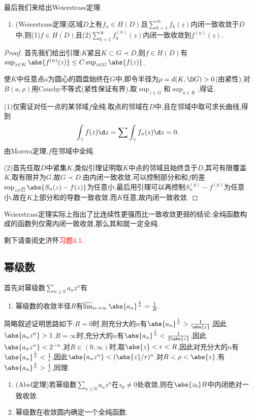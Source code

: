 \documentclass{article}
\newcommand{\exerfunc}[1]{剩下请查阅史济怀\textcolor{red}{习题#1}.}
\begin{document}
最后我们来给出Weierstrass定理.\begin{enumerate}[resume]
    \item (Weierstrass定理)区域$D$上有$f_n\in H(D)$且$\sum_{k=1}^\infty f_k(z)$内闭一致收敛于$D$中,则(1)$f\in H(D)$且(2)$\sum_{k=1}^\infty f_k^{(n)}(z)$内闭一致收敛到$f^{(n)}(z)$.
\end{enumerate}
\begin{proof}
    首先我们给出引理:$K$紧且$K\subset G\prec D$,则$f\in H(D)$有$\sup_{z\in K}\abs{f^{(n)}(z)}\leq C\sup_{z\in G}\abs{f(z)}$.
    
    使$K$中任意点$a$为圆心的圆盘始终在$G$中,即令半径为$\rho=d(K,\D G)>0$(由紧性).对$B(a,\rho)$用Cauchy不等式(紧性保证有界),取$\sup_{z\in G}$和$\sup_{a\in K}$,得证.

    (1)仅需证对任一点的某邻域$f$全纯.取点的邻域在$D$中,且在邻域中取可求长曲线,得到$$\int_\gamma f(z)\d z=\sum\int_\gamma f_n(z)\d z=0.$$由Morera定理,$f$在邻域中全纯.

    (2)首先任取$D$中紧集$K$,类似引理证明取$K$中点的邻域且始终含于$D$,其可有限覆盖$K$,取有限并为$G$,故$G\prec D$.由内闭一致收敛,可以控制部分和和$f$的差$\sup_{z\in\overline{G}}\abs{S_n(z)-f(z)}$为任意小.最后用引理可以再控制$S_n^{(p)}-f^{(p)}$为任意小,故在$K$上部分和的导数一致收敛.而$K$任意,故内闭一致收敛.
\end{proof}
Weierstrass定理实际上指出了比连续性更强而比一致收敛更弱的结论:全纯函数构成的函数列仅需内闭一致收敛,那么其和就一定全纯.

\exerfunc{4.1}

\subsection{幂级数}
首先对幂级数$\sum_{n\geq 0}a_nz^n$有\begin{enumerate}
    \item 幂级数的收敛半径$R$有$\varlimsup_{n\to \infty}\abs{a_n}^{\frac{1}{n}}=\frac{1}{R}$.
\end{enumerate}
简略叙述证明思路如下:$R=0$时,则充分大的$n$有$\abs{a_n}^{\frac{1}{n}}>\frac{1}{\abs{z}}$,因此$\abs{a_nz^n}>1$.$R=\infty$时,充分大的$n$有$\abs{a_n}^{\frac{1}{n}}<\frac{1}{2\abs{z}}$,因此$\abs{a_nz^n}<2^{-n}$.对$R\in (0,\infty)$时,取$\abs{z}<r<R$,因此对充分大的$n$有$\abs{a_n}^{\frac{1}{n}}<\frac{1}{r}$,因此$\abs{a_nz^n}<(\abs{z}/r)^n$.对$R<\rho<\abs{z}$,有$\abs{a_n}^{\frac{1}{n}}>\frac{1}{r}$,同理.

\begin{enumerate}[resume]
    \item (Abel定理)若幂级数$\sum_{n\geq 0}a_nz^n$在$z_0\neq 0$处收敛,则在$\abs{z_0}B$中内闭绝对一致收敛.\\
    \item 幂级数在收敛圆内确定一个全纯函数.
\end{enumerate}
\end{document}

